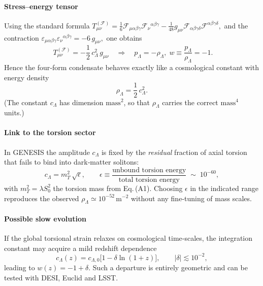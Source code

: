 \documentclass{article}
\begin{document}
\paragraph{Stress--energy tensor}
Using the standard formula
\(
T_{\mu\nu}^{(\mathcal F)}=
\tfrac16 \mathcal F_{\mu\alpha\beta\gamma}
        \mathcal F_{\nu}{}^{\alpha\beta\gamma}
        -\tfrac1{48}g_{\mu\nu}\mathcal F_{\alpha\beta\gamma\delta}
                               \mathcal F^{\alpha\beta\gamma\delta},
\)
and the contraction
\(
\varepsilon_{\mu\alpha\beta\gamma}\varepsilon_{\nu}{}^{\alpha\beta\gamma}
=-6\,g_{\mu\nu},
\)
one obtains
\begin{equation}\label{eq:TF}
  \boxed{\;
  T_{\mu\nu}^{(\mathcal F)} = -\frac{1}{2}\,c_\Lambda^{2}\,g_{\mu\nu}}
  \quad\Longrightarrow\quad
  p_\Lambda = -\rho_\Lambda,\;
  w\equiv\frac{p_\Lambda}{\rho_\Lambda} = -1 .
\end{equation}
Hence the four‑form condensate behaves exactly like a cosmological constant with
energy density
\begin{equation}\label{eq:rhoLambda}
  \rho_\Lambda = \frac{1}{2}\,c_\Lambda^{2}.
\end{equation}
(The constant $c_\Lambda$ has dimension $\text{mass}^2$, so that
$\rho_\Lambda$ carries the correct $\text{mass}^4$ units.)

\paragraph{Link to the torsion sector}
In GENESIS the amplitude $c_\Lambda$ is fixed by the \emph{residual} fraction of
axial torsion that fails to bind into dark‑matter solitons:
\begin{equation}\label{eq:cLambda}
  c_\Lambda = m_T^{2}\,\sqrt{\epsilon},
  \qquad
  \epsilon \equiv
  \frac{\text{unbound torsion energy}}{\text{total torsion energy}}
  \;\sim\;10^{-60},
\end{equation}
with $m_T^{2}=\lambda S_{0}^{2}$ the torsion mass from
Eq.\,(A1).  Choosing $\epsilon$ in the indicated range reproduces the observed
\(\rho_\Lambda\simeq10^{-52}\,\mathrm{m}^{-2}\) without any fine‑tuning of mass
scales.

\paragraph{Possible slow evolution}
If the global torsional strain relaxes on cosmological time‑scales, the
integration constant may acquire a mild redshift dependence
\begin{equation}\label{eq:runningc}
  c_\Lambda(z) = c_{\Lambda,0}\bigl[1-\delta\ln(1+z)\bigr],
  \qquad
  |\delta|\lesssim10^{-2},
\end{equation}
leading to
\(w(z) = -1 + \delta\).  
Such a departure is entirely geometric and can be tested with DESI,
Euclid and LSST.
\end{document}
